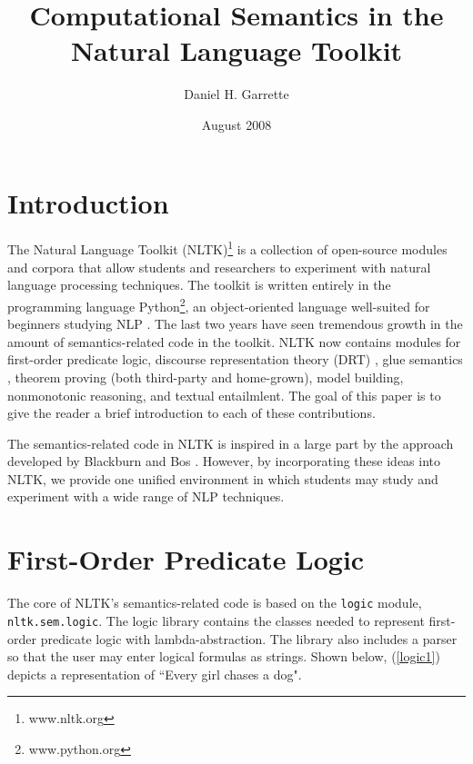 \documentclass{article}
\newcommand{\dhgcode}[1]{{\tt #1}}
\begin{document}
\title{Computational Semantics in the Natural Language Toolkit}
\author{Daniel H. Garrette}
\date{August 2008}
\maketitle

\begin{abstract}

\end{abstract}

\section{Introduction}
The Natural Language Toolkit (NLTK)\footnote{www.nltk.org} is a collection of open-source modules and corpora that allow students and researchers to experiment with natural language processing techniques.  The toolkit is written entirely in the programming language Python\footnote{www.python.org}, an object-oriented language well-suited for beginners studying NLP \cite{Multidisciplinary}.  The last two years have seen tremendous growth in the amount of semantics-related code in the toolkit.  NLTK now contains modules for first-order predicate logic, discourse representation theory (DRT) \cite{KampReyle}, glue semantics \cite{Dalrymple2001}, theorem proving (both third-party and home-grown), model building, nonmonotonic reasoning, and textual entailmlent.  The goal of this paper is to give the reader a brief introduction to each of these contributions.

The semantics-related code in NLTK is inspired in a large part by the approach developed by Blackburn and Bos \cite{BB}.  However, by incorporating these ideas into NLTK, we provide one unified environment in which students may study and experiment with a wide range of NLP techniques.

\section{First-Order Predicate Logic}
The core of NLTK's semantics-related code is based on the \dhgcode{logic} module, \dhgcode{nltk.sem.logic}.  The logic library contains the classes needed to represent first-order predicate logic with lambda-abstraction.  The library also includes a parser so that the user may enter logical formulas as strings.  Shown below, (\ref{logic1}) depicts a representation of ``Every girl chases a dog".  

\enumsentence{\label{logic1}\dhgcode{all x.(girl(x) -$>$ exists y.(dog(x) \& chase(x,y)))}}
\end{document}
